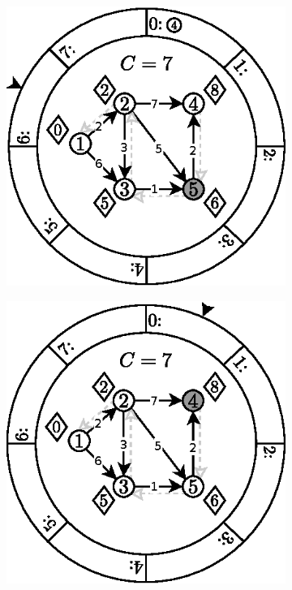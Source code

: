 \begin{figure}[!htbp]
\begin{subfigure}[b]{0.33\textwidth}
		\caption{}
	\end{subfigure}%
	\begin{subfigure}[b]{0.33\textwidth}
		\includegraphics[width=\textwidth]{Chapter_II/2/e.eps}
		\caption{}
	\end{subfigure}
	\begin{subfigure}[b]{0.33\textwidth}
		\includegraphics[width=\textwidth]{Chapter_II/2/f.eps}

\end{subfigure}
\end{figure}
